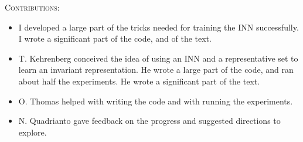 \noindent\textsc{Contributions:}
\begin{itemize}
    \item I developed a large part of the tricks needed for training the \ac{INN} successfully. I
        wrote a significant part of the code, and of the text.
    \item T. Kehrenberg conceived the idea of using an \acf{INN} and a representative set to learn
        an invariant representation. He wrote a large part of the code, and ran about half the
        experiments. He wrote a significant part of the text.
    \item O. Thomas helped with writing the code and with running the experiments.
    \item N. Quadrianto gave feedback on the progress and suggested directions to explore.
\end{itemize}
